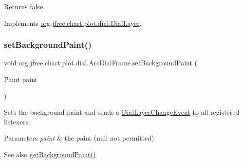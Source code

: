\begin{DoxyReturn}{Returns}
{\ttfamily false}. 
\end{DoxyReturn}


Implements \mbox{\hyperlink{interfaceorg_1_1jfree_1_1chart_1_1plot_1_1dial_1_1_dial_layer_a822eeadbe31b48827497714abeda2190}{org.\+jfree.\+chart.\+plot.\+dial.\+Dial\+Layer}}.

\mbox{\label{classorg_1_1jfree_1_1chart_1_1plot_1_1dial_1_1_arc_dial_frame_ac61fd04399b1f4f5c80d18edfb84c88b}} 
\subsubsection{\texorpdfstring{set\+Background\+Paint()}{setBackgroundPaint()}}
{\footnotesize\ttfamily void org.\+jfree.\+chart.\+plot.\+dial.\+Arc\+Dial\+Frame.\+set\+Background\+Paint (\begin{DoxyParamCaption}\item[{Paint}]{paint }\end{DoxyParamCaption})}

Sets the background paint and sends a \mbox{\hyperlink{classorg_1_1jfree_1_1chart_1_1plot_1_1dial_1_1_dial_layer_change_event}{Dial\+Layer\+Change\+Event}} to all registered listeners.


\begin{DoxyParams}{Parameters}
{\em paint} & the paint ({\ttfamily null} not permitted).\\
\hline
\end{DoxyParams}
\begin{DoxySeeAlso}{See also}
\mbox{\hyperlink{classorg_1_1jfree_1_1chart_1_1plot_1_1dial_1_1_arc_dial_frame_a6f3e72c03452c65f7bd85a00e589eebe}{get\+Background\+Paint()}} 
\end{DoxySeeAlso}
\mbox{\label{classorg_1_1jfree_1_1chart_1_1plot_1_1dial_1_1_arc_dial_frame_a4b7b0351cdc0a449229ba4201f11e0c5}} 
